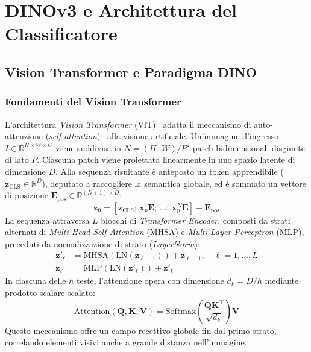 \chapter{DINOv3 e Architettura del Classificatore}
\label{chap:architettura}

\section{Vision Transformer e Paradigma DINO}
\label{sec:arch_vit}

\subsection{Fondamenti del Vision Transformer}
L'architettura \textit{Vision Transformer} (ViT)~\cite{dosovitskiy2020image} adatta il meccanismo di auto-attenzione (\textit{self-attention})~\cite{vaswani2017attention} alla visione artificiale. Un'immagine d'ingresso $I \in \mathbb{R}^{H \times W \times C}$ viene suddivisa in $N = (H \cdot W) / P^2$ patch bidimensionali disgiunte di lato $P$. Ciascuna patch viene proiettata linearmente in uno spazio latente di dimensione $D$. Alla sequenza risultante è anteposto un token apprendibile ($\mathbf{z}_{\text{CLS}} \in \mathbb{R}^D$), deputato a raccogliere la semantica globale, ed è sommato un vettore di posizione $\mathbf{E}_{\text{pos}} \in \mathbb{R}^{(N+1) \times D}$:
\begin{equation}
    \mathbf{z}_0 = \left[ \mathbf{z}_{\text{CLS}}; \, \mathbf{x}_p^1 \mathbf{E}; \, \dots; \, \mathbf{x}_p^N \mathbf{E} \right] + \mathbf{E}_{\text{pos}}
\end{equation}
La sequenza attraversa $L$ blocchi di \textit{Transformer Encoder}, composti da strati alternati di \textit{Multi-Head Self-Attention} (MHSA) e \textit{Multi-Layer Perceptron} (MLP), preceduti da normalizzazione di strato (\textit{LayerNorm}):
\begin{align}
    \mathbf{z}'_\ell &= \text{MHSA}(\text{LN}(\mathbf{z}_{\ell-1})) + \mathbf{z}_{\ell-1}, \quad \ell = 1, \dots, L \\
    \mathbf{z}_\ell &= \text{MLP}(\text{LN}(\mathbf{z}'_\ell)) + \mathbf{z}'_\ell
\end{align}
In ciascuna delle $h$ teste, l'attenzione opera con dimensione $d_k = D / h$ mediante prodotto scalare scalato:
\begin{equation}
    \text{Attention}(\mathbf{Q}, \mathbf{K}, \mathbf{V}) = \text{Softmax}\left( \frac{\mathbf{Q} \mathbf{K}^\top}{\sqrt{d_k}} \right) \mathbf{V}
\end{equation}
Questo meccanismo offre un campo recettivo globale fin dal primo strato, correlando elementi visivi anche a grande distanza nell'immagine.

